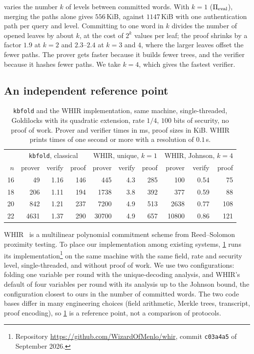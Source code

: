  varies the number $k$ of levels between committed words.
With $k = 1$ ($\Pi_{\mathrm{eval}}$), merging the paths alone gives $556$\,KiB, against $1147$\,KiB with one authentication path per query and level.
Committing to one word in $k$ divides the number of opened leaves by about $k$, at the cost of $2^k$ values per leaf; the proof shrinks by a factor $1.9$ at $k = 2$ and $2.3$--$2.4$ at $k = 3$ and $4$, where the larger leaves offset the fewer paths.
The prover gets faster because it builds fewer trees, and the verifier because it hashes fewer paths.
We take $k = 4$, which gives the fastest verifier.

\subsection{An independent reference point}\label{sec:exp:whir}

\begin{table}[t]
\centering
\small
\begin{tabular}{r rrr rrr rrr}
\toprule
 & \multicolumn{3}{c}{\texttt{kbfold}, classical} & \multicolumn{3}{c}{WHIR, unique, $k = 1$} & \multicolumn{3}{c}{WHIR, Johnson, $k = 4$} \\
$n$ & prover & verify & proof & prover & verify & proof & prover & verify & proof \\
\midrule
16 & 49 & 1.16 & 146 & 445 & 4.3 & 285 & 100 & 0.54 & 75 \\
18 & 206 & 1.11 & 194 & 1738 & 3.8 & 392 & 377 & 0.59 & 88 \\
20 & 842 & 1.21 & 237 & 7200 & 4.9 & 513 & 2638 & 0.77 & 108 \\
22 & 4631 & 1.37 & 290 & 30700 & 4.9 & 657 & 10800 & 0.86 & 121 \\
\bottomrule
\end{tabular}
\caption{\texttt{kbfold} and the WHIR implementation, same machine, single-threaded, Goldilocks with its quadratic extension, rate $1/4$, $100$ bits of security, no proof of work. Prover and verifier times in ms, proof sizes in KiB. WHIR prints times of one second or more with a resolution of $0.1$\,s.}
\label{tab:whir}
\end{table}

WHIR~\cite{ACFY24} is a multilinear polynomial commitment scheme from Reed--Solomon proximity testing.
To place our implementation among existing systems, \cref{tab:whir} runs its implementation\footnote{Repository \url{https://github.com/WizardOfMenlo/whir}, commit \texttt{c03a4a5} of September 2026.} on the same machine with the same field, rate and security level, single-threaded, and without proof of work.
We use two configurations: folding one variable per round with the unique-decoding analysis, and WHIR's default of four variables per round with its analysis up to the Johnson bound, the configuration closest to ours in the number of committed words.
The two code bases differ in many engineering choices (field arithmetic, Merkle trees, transcript, proof encoding), so \cref{tab:whir} is a reference point, not a comparison of protocols.

